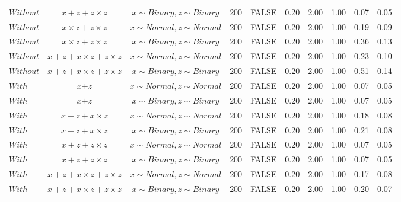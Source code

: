 \begin{table}[ht]
{\begin{tabular}{lccccccccc}
  $Without$ & $\textit{x} + \textit{z} + \textit{z} \times \textit{z}$ & $\textit{x} \sim Binary, \textit{z} \sim Binary$ & 200 & FALSE & 0.20 & 2.00 & 1.00 & 0.07 & 0.05 \\ 
  $Without$ & $\textit{x} \times \textit{z} + \textit{z} \times \textit{z}$ & $\textit{x} \sim Normal , \textit{z} \sim Normal$ & 200 & FALSE & 0.20 & 2.00 & 1.00 & 0.19 & 0.09 \\ 
  $Without$ & $\textit{x} \times \textit{z} + \textit{z} \times \textit{z}$ & $\textit{x} \sim Binary, \textit{z} \sim Binary$ & 200 & FALSE & 0.20 & 2.00 & 1.00 & 0.36 & 0.13 \\ 
  $Without$ & $\textit{x} + \textit{z} + \textit{x} \times \textit{z} + \textit{z} \times \textit{z}$ & $\textit{x} \sim Normal , \textit{z} \sim Normal$ & 200 & FALSE & 0.20 & 2.00 & 1.00 & 0.23 & 0.10 \\ 
  $Without$ & $\textit{x} + \textit{z} + \textit{x} \times \textit{z} + \textit{z} \times \textit{z}$ & $\textit{x} \sim Binary, \textit{z} \sim Binary$ & 200 & FALSE & 0.20 & 2.00 & 1.00 & 0.51 & 0.14 \\ 
  $With$ & $\textit{x} + \textit{z}$ & $\textit{x} \sim Normal , \textit{z} \sim Normal$ & 200 & FALSE & 0.20 & 2.00 & 1.00 & 0.07 & 0.05 \\ 
  $With$ & $\textit{x} + \textit{z}$ & $\textit{x} \sim Binary, \textit{z} \sim Binary$ & 200 & FALSE & 0.20 & 2.00 & 1.00 & 0.07 & 0.05 \\ 
  $With$ & $\textit{x} + \textit{z} + \textit{x} \times \textit{z}$ & $\textit{x} \sim Normal , \textit{z} \sim Normal$ & 200 & FALSE & 0.20 & 2.00 & 1.00 & 0.18 & 0.08 \\ 
  $With$ & $\textit{x} + \textit{z} + \textit{x} \times \textit{z}$ & $\textit{x} \sim Binary, \textit{z} \sim Binary$ & 200 & FALSE & 0.20 & 2.00 & 1.00 & 0.21 & 0.08 \\ 
  $With$ & $\textit{x} + \textit{z} + \textit{z} \times \textit{z}$ & $\textit{x} \sim Normal , \textit{z} \sim Normal$ & 200 & FALSE & 0.20 & 2.00 & 1.00 & 0.07 & 0.05 \\ 
  $With$ & $\textit{x} + \textit{z} + \textit{z} \times \textit{z}$ & $\textit{x} \sim Binary, \textit{z} \sim Binary$ & 200 & FALSE & 0.20 & 2.00 & 1.00 & 0.07 & 0.05 \\ 
  $With$ & $\textit{x} + \textit{z} + \textit{x} \times \textit{z} + \textit{z} \times \textit{z}$ & $\textit{x} \sim Normal , \textit{z} \sim Normal$ & 200 & FALSE & 0.20 & 2.00 & 1.00 & 0.17 & 0.08 \\ 
  $With$ & $\textit{x} + \textit{z} + \textit{x} \times \textit{z} + \textit{z} \times \textit{z}$ & $\textit{x} \sim Binary, \textit{z} \sim Binary$ & 200 & FALSE & 0.20 & 2.00 & 1.00 & 0.20 & 0.07 \\ 
   \hline
\end{tabular}
}
\end{table}
